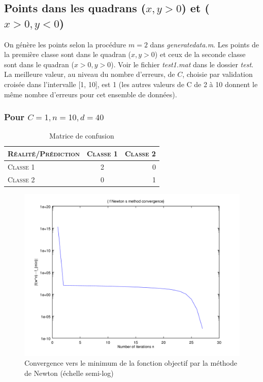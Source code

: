 \documentclass{article}
\begin{document}
\subsection{Points dans les quadrans ($x, y > 0$) et ($x > 0, y < 0$)}

On génère les points selon la procédure $m = 2$ dans \emph{generatedata.m}. Les points de la première classe sont dans le quadran ($x, y > 0$) et ceux de la seconde classe sont dans le quadran ($x > 0, y > 0$). Voir le fichier \emph{test1.mat} dans le dossier \emph{test}. La meilleure valeur, au niveau du nombre d'erreurs, de $C$, choisie par validation croisée dans l'intervalle [1, 10], est 1 (les autres valeurs de C de 2 à 10 donnent le même nombre d'erreurs pour cet ensemble de données).

\subsubsection{Pour $C=1, n=10, d=40$}

     \begin{table}[H]
       \caption{Matrice de confusion}
       \begin{tabular}{|l|c|r|}
         \hline
         \textsc{Réalité/Prédiction} & \textsc{Classe 1} & \textsc{Classe 2}\\
         \hline
         \textsc{Classe 1} & 2 & 0\\
         \hline
         \textsc{Classe 2} & 0 & 1\\
         \hline
       \end{tabular}
     \end{table}

         \begin{figure}
           \begin{center}
             \subfigure\includegraphics[scale=0.5]{images/cvnewton1.png}
             \caption{Convergence vers le minimum de la fonction objectif par la méthode de Newton (échelle semi-log)}
           \end{center}
         \end{figure}
\end{document}
